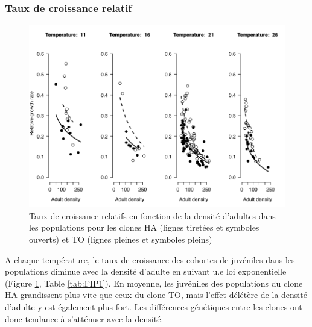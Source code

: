 \subsubsection{Taux de croissance relatif}

\begin{figure}[!ht]
\begin{center}
\includegraphics[width=\textwidth]{1_CorpsDeThese/Resumes/Fig/FIP04}
\caption[Taux de croissance
relatifs]{Taux de croissance relatifs en fonction de la densité d'adultes dans
les populations pour les clones HA (lignes tiretées et symboles ouverts) et TO
(lignes pleines et symboles pleins)}
\label{fig:FIP4}
\end{center}
\end{figure}

A chaque température, le taux de croissance des cohortes de juvéniles dans les
populations diminue avec la densité d'adulte en suivant u.e loi exponentielle
(Figure \ref{fig:FIP4}, Table \ref{tab:FIP1}). En moyenne, les juvéniles des
populations du clone HA grandissent plus vite que ceux du clone TO, mais l'effet
délétère de la densité d'adulte y est également plus fort. Les différences
génétiques entre les clones ont donc tendance à s'atténuer avec la densité. 


